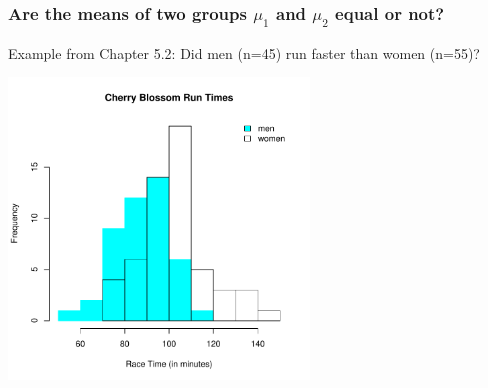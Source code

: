 \documentclass[slides]{beamer}
\begin{document}
%
%
\begin{frame}[fragile]
\frametitle{Are the means of two groups $\mu_1$ and $\mu_2$ equal or not?}

Example from Chapter 5.2:  Did men (n=45) run faster than women (n=55)?
\begin{center}
\includegraphics[width=0.6\textwidth]{figure/race.pdf}
\end{center}

\end{frame}
\end{document}
